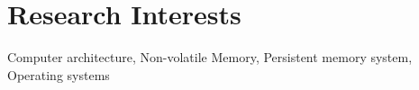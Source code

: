\section*{Research Interests}
\begin{description}

\item Computer architecture, Non-volatile Memory, Persistent memory system, Operating systems

\end{description}
